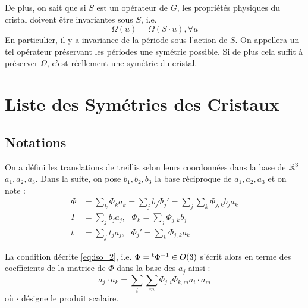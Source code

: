 \documentclass{cours}
\begin{document}
De plus, on sait que si $S$ est un opérateur de $G$, les propriétés physiques du cristal doivent être invariantes sous $S$, i.e.
\begin{equation}
    \Omega(u) = \Omega(S \cdot u), \forall u
\end{equation}
En particulier, il y a invariance de la période sous l'action de $S$. On appellera un tel opérateur préservant les périodes une symétrie possible. Si de plus cela suffit à préserver $\Omega$, c'est réellement une symétrie du cristal.


\section{Liste des Symétries des Cristaux}
\subsection{Notations}
On a défini les translations de treillis selon leurs coordonnées dans la base de $\mathbb{R}^{3}$ $a_{1}, a_{2}, a_{3}$. Dans la suite, on pose $b_{1}, b_{2}, b_{3}$ la base réciproque de $a_{1}, a_{2}, a_{3}$ et on note :
\begin{align}
    \Phi & = \sum_{k}\Phi_{k}a_{k} = \sum_{j}b_{j}\Phi_{j}' = \sum_{j}\sum_{k}\Phi_{j,k}b_{j}a_{k} \\
    I    & = \sum_{j}b_{j}a_{j}, \hspace{8pt} \Phi_{k} = \sum_{j}\Phi_{j,k}b_{j}                   \\
    t    & = \sum_{j}t_{j}a_{j}, \hspace{8pt} \Phi_{j}' = \sum_{k}\Phi_{j, k}a_{k}
\end{align}

La condition décrite \ref{eq:iso_2}, i.e. $\Phi = {^{\mathsf{t}}}\Phi^{-1} \in O(3)$ s'écrit alors en terme des coefficients de la matrice de $\Phi$ dans la base des $a_{j}$ ainsi :
\begin{equation}\label{eq:interlation}
    a_{j} \cdot a_{k} = \sum_{i}\sum_{m}\Phi_{j,i}\Phi_{k,m}a_{i}\cdot a_{m}
\end{equation}
où $\cdot$ désigne le produit scalaire.
\end{document}
